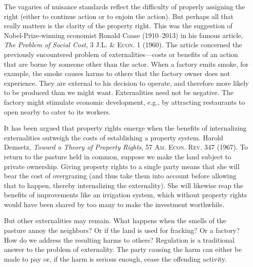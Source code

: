 
The vagaries of nuisance standards reflect the difficulty of properly assigning
the right (either to continue action or to enjoin the action). But perhaps all
that really matters is the clarity of the property right. This was the
suggestion of Nobel-Prize-winning economist Ronald Coase (1910--2013) in his
famous article, \textit{The Problem of Social Cost}, 3 \textsc{J.L. \& Econ}. 1
(1960). The article concerned the previously encountered problem of
externalities---costs or benefits of an action that are borne by someone other
than the actor. When a factory emits smoke, for example, the smoke causes harms
to others that the factory owner does not experience. They are external to his
decision to operate, and therefore more likely to be produced than we might
want. Externalities need not be negative. The factory might stimulate economic
development, e.g., by attracting restaurants to open nearby to cater to its
workers. 

It has been argued that property rights emerge when the benefits of
internalizing externalities outweigh the costs of establishing a property
system. Harold Demsetz, \textit{Toward a Theory of Property Rights}, 57
\textsc{Am. Econ. Rev.} 347 (1967). To return to the pasture held in common,
suppose we make the land subject to private ownership. Giving property rights to
a single party means that she will bear the cost of overgrazing (and thus take
them into account before allowing that to happen, thereby internalizing the
externality). She will likewise reap the benefits of improvements like an
irrigation system, which without property rights would have been shared by too
many to make the investment worthwhile.

But other externalities may remain. What happens when the smells of the pasture
annoy the neighbors? Or if the land is used for fracking? Or a factory? How do
we address the resulting harms to others? Regulation is a traditional answer to
the problem of externality. The party causing the harm can either be made to pay
or, if the harm is serious enough, cease the offending activity.

